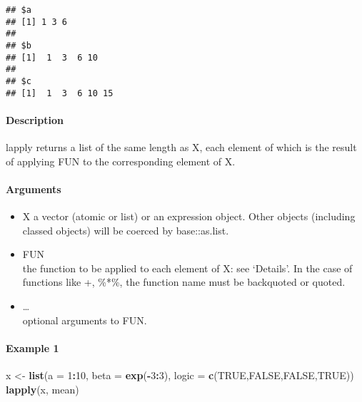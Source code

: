 \documentclass[
]{article}
\newenvironment{Shaded}{\begin{snugshade}}{\end{snugshade}}
\newcommand{\AttributeTok}[1]{\textcolor[rgb]{0.13,0.29,0.53}{#1}}
\newcommand{\ConstantTok}[1]{\textcolor[rgb]{0.56,0.35,0.01}{#1}}
\newcommand{\DecValTok}[1]{\textcolor[rgb]{0.00,0.00,0.81}{#1}}
\newcommand{\FunctionTok}[1]{\textcolor[rgb]{0.13,0.29,0.53}{\textbf{#1}}}
\newcommand{\NormalTok}[1]{#1}
\newcommand{\OtherTok}[1]{\textcolor[rgb]{0.56,0.35,0.01}{#1}}
\newcommand{\SpecialCharTok}[1]{\textcolor[rgb]{0.81,0.36,0.00}{\textbf{#1}}}
\begin{document}
\begin{verbatim}
## $a
## [1] 1 3 6
## 
## $b
## [1]  1  3  6 10
## 
## $c
## [1]  1  3  6 10 15
\end{verbatim}

\hypertarget{description-1}{%
\paragraph{Description}\label{description-1}}

lapply returns a list of the same length as X, each element of which is
the result of applying FUN to the corresponding element of X.

\hypertarget{arguments-1}{%
\paragraph{Arguments}\label{arguments-1}}

\begin{itemize}
\item
  X a vector (atomic or list) or an expression object. Other objects
  (including classed objects) will be coerced by base::as.list.
\item
  FUN\\
  the function to be applied to each element of X: see `Details'. In the
  case of functions like +, \%*\%, the function name must be backquoted
  or quoted.
\item
  \ldots{}\\
  optional arguments to FUN.
\end{itemize}

\hypertarget{example-1}{%
\paragraph{Example 1}\label{example-1}}

\begin{Shaded}
\begin{Highlighting}[]
\NormalTok{x }\OtherTok{\textless{}{-}} \FunctionTok{list}\NormalTok{(}\AttributeTok{a =} \DecValTok{1}\SpecialCharTok{:}\DecValTok{10}\NormalTok{, }\AttributeTok{beta =} \FunctionTok{exp}\NormalTok{(}\SpecialCharTok{{-}}\DecValTok{3}\SpecialCharTok{:}\DecValTok{3}\NormalTok{), }\AttributeTok{logic =} \FunctionTok{c}\NormalTok{(}\ConstantTok{TRUE}\NormalTok{,}\ConstantTok{FALSE}\NormalTok{,}\ConstantTok{FALSE}\NormalTok{,}\ConstantTok{TRUE}\NormalTok{))}
\FunctionTok{lapply}\NormalTok{(x, mean)}
\end{Highlighting}
\end{Shaded}
\end{document}
